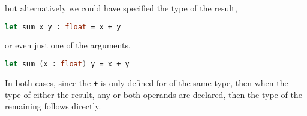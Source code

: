 but alternatively we could have specified the type of the result,
\begin{lstlisting}[language=fsharp]
  let sum x y : float = x + y
\end{lstlisting}
or even just one of the arguments,
\begin{lstlisting}[language=fsharp]
  let sum (x : float) y = x + y
\end{lstlisting}
In both cases, since the \lstinline|+|  is only defined for  of the same type, then when the type of either the result, any or both operands are declared, then the type of the remaining follows directly.

